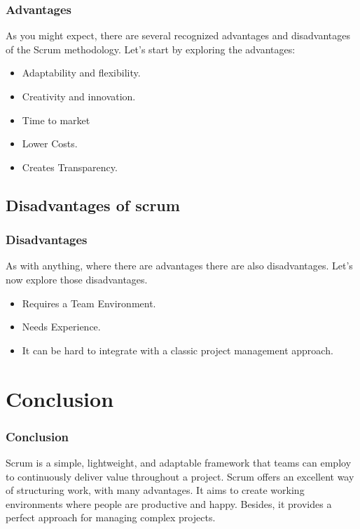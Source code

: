 \documentclass[
	11pt, %
]{beamer}
\begin{document}
\begin{frame}
	\frametitle{Advantages}
	As you might expect, there are several recognized advantages and disadvantages of the Scrum methodology.
	Let's start by exploring the advantages:
	\newline

	\begin{itemize}
		\item Adaptability and flexibility.
		\item Creativity and innovation.
		\item Time to market
		\item Lower Costs.
		\item Creates Transparency.
	\end{itemize}

\end{frame}

\subsection{Disadvantages of scrum}
\begin{frame}
	\frametitle{Disadvantages}
	As with anything, where there are advantages there are also disadvantages.
	Let's now explore those disadvantages.
	\newline

	\begin{itemize}
		\item Requires a Team Environment.
		\item Needs Experience.
		\item  It can be hard to integrate with a classic project management approach.
	\end{itemize}
\end{frame}


\section{Conclusion}

\begin{frame}
	\frametitle{Conclusion}
	Scrum is a simple, lightweight, and adaptable framework that
	teams can employ to continuously deliver value throughout a project.
	Scrum offers an excellent way of structuring work, with many advantages.
	It aims to create working environments where people are productive and happy.
	Besides, it provides a perfect approach for managing complex projects.
\end{frame}
\end{document}
